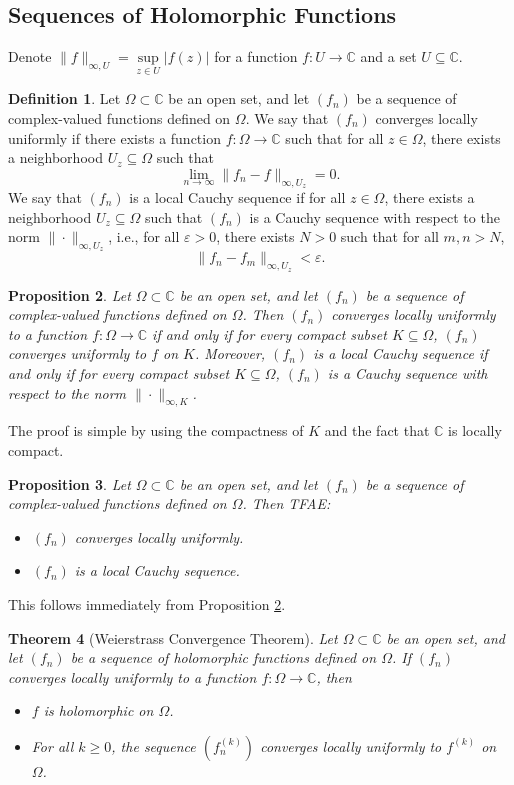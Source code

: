 \documentclass{article}
\newtheorem{theorem}{Theorem}[section]
\newtheorem{proposition}[theorem]{Proposition}
\theoremstyle{definition}
\newtheorem{definition}[theorem]{Definition}
\newcommand{\C}{\mathbb{C}}
\renewcommand{\geq}{\geqslant}
\begin{document}
\subsection{Sequences of Holomorphic Functions}
Denote $\|f\|_{\infty,U}=\sup\limits_{z\in U}|f(z)|$ for a function $f\colon U\to \C$ and a set $U\subseteq \C$.
\begin{definition}
    Let \(\Omega\subset\C\) be an open set, and let \((f_n)\) be a sequence of complex-valued functions defined on \(\Omega\).
    We say that \((f_n)\) converges locally uniformly if there exists a function $f\colon \Omega \to \C$
    such that for all $z\in\Omega$, there exists a neighborhood $U_z\subseteq \Omega$ such that \[\lim_{n\to \infty} \|f_n - f\|_{\infty,U_z} = 0.\]
    We say that \((f_n)\) is a local Cauchy sequence if for all $z\in\Omega$, there exists a neighborhood $U_z\subseteq \Omega$ such that 
    \((f_n)\) is a Cauchy sequence with respect to the norm \(\|\cdot\|_{\infty,U_z}\), i.e., for all \(\varepsilon>0\), there exists \(N>0\) such that for all \(m,n>N\), 
    \[\|f_n - f_m\|_{\infty,U_z} < \varepsilon.\]
\end{definition}
\begin{proposition}\label{prop:seq equiv}
    Let \(\Omega\subset\C\) be an open set, and let \((f_n)\) be a sequence of complex-valued functions defined on \(\Omega\). 
    Then \((f_n)\) converges locally uniformly to a function \(f\colon\Omega\to\C\) if and only if for every compact subset \(K\subseteq \Omega\), \((f_n)\) converges uniformly to \(f\) on \(K\).
    Moreover, \((f_n)\) is a local Cauchy sequence if and only if for every compact subset \(K\subseteq \Omega\), \((f_n)\) is a Cauchy sequence with respect to the norm \(\|\cdot\|_{\infty,K}\).
\end{proposition}
The proof is simple by using the compactness of $K$ and the fact that $\C$ is locally compact.
\begin{proposition}
    Let \(\Omega\subset\C\) be an open set, and let \((f_n)\) be a sequence of complex-valued functions defined on \(\Omega\). Then TFAE:
    \begin{itemize}
        \item \((f_n)\) converges locally uniformly.
        \item \((f_n)\) is a local Cauchy sequence.
    \end{itemize}
\end{proposition}
This follows immediately from Proposition \ref{prop:seq equiv}.
\begin{theorem}[Weierstrass Convergence Theorem]
    Let \(\Omega\subset\C\) be an open set, and let \((f_n)\) be a sequence of holomorphic functions defined on \(\Omega\). If \((f_n)\) converges locally uniformly to a function \(f\colon\Omega\to\C\), then 
    \begin{itemize}
        \item \(f\) is holomorphic on \(\Omega\).
        \item For all \(k\geq 0\), the sequence \(\left(f_n^{(k)}\right)\) converges locally uniformly to \(f^{(k)}\) on \(\Omega\).
    \end{itemize}
\end{theorem}
\end{document}
